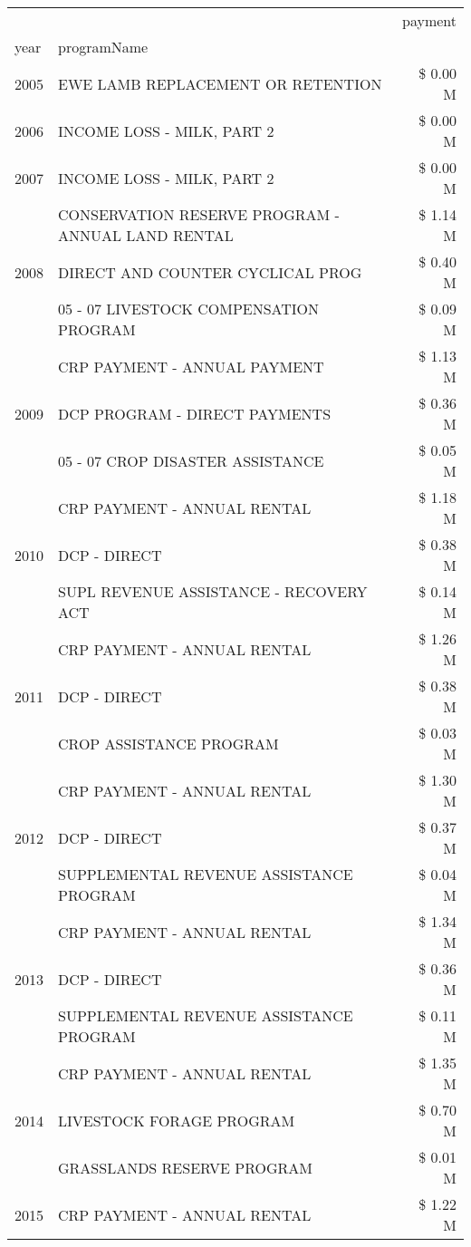\begin{tabular}{llr}
\toprule
 &  & payment \\
year & programName &  \\
\midrule
2005 & EWE LAMB REPLACEMENT OR RETENTION & \$ 0.00 M \\
\cline{1-3}
2006 & INCOME LOSS - MILK, PART 2 & \$ 0.00 M \\
\cline{1-3}
2007 & INCOME LOSS - MILK, PART 2 & \$ 0.00 M \\
\cline{1-3}
\multirow[t]{3}{*}{2008} & CONSERVATION RESERVE PROGRAM - ANNUAL LAND RENTAL & \$ 1.14 M \\
 & DIRECT AND COUNTER CYCLICAL PROG & \$ 0.40 M \\
 & 05 - 07 LIVESTOCK COMPENSATION PROGRAM & \$ 0.09 M \\
\cline{1-3}
\multirow[t]{3}{*}{2009} & CRP PAYMENT - ANNUAL PAYMENT & \$ 1.13 M \\
 & DCP PROGRAM - DIRECT PAYMENTS & \$ 0.36 M \\
 & 05 - 07 CROP DISASTER ASSISTANCE & \$ 0.05 M \\
\cline{1-3}
\multirow[t]{3}{*}{2010} & CRP PAYMENT - ANNUAL RENTAL & \$ 1.18 M \\
 & DCP - DIRECT & \$ 0.38 M \\
 & SUPL REVENUE ASSISTANCE - RECOVERY ACT & \$ 0.14 M \\
\cline{1-3}
\multirow[t]{3}{*}{2011} & CRP PAYMENT - ANNUAL RENTAL & \$ 1.26 M \\
 & DCP - DIRECT & \$ 0.38 M \\
 & CROP ASSISTANCE PROGRAM & \$ 0.03 M \\
\cline{1-3}
\multirow[t]{3}{*}{2012} & CRP PAYMENT - ANNUAL RENTAL & \$ 1.30 M \\
 & DCP - DIRECT & \$ 0.37 M \\
 & SUPPLEMENTAL REVENUE ASSISTANCE PROGRAM & \$ 0.04 M \\
\cline{1-3}
\multirow[t]{3}{*}{2013} & CRP PAYMENT - ANNUAL RENTAL & \$ 1.34 M \\
 & DCP - DIRECT & \$ 0.36 M \\
 & SUPPLEMENTAL REVENUE ASSISTANCE PROGRAM & \$ 0.11 M \\
\cline{1-3}
\multirow[t]{3}{*}{2014} & CRP PAYMENT - ANNUAL RENTAL & \$ 1.35 M \\
 & LIVESTOCK FORAGE PROGRAM & \$ 0.70 M \\
 & GRASSLANDS RESERVE PROGRAM & \$ 0.01 M \\
\cline{1-3}
\multirow[t]{3}{*}{2015} & CRP PAYMENT - ANNUAL RENTAL & \$ 1.22 M \\

\end{tabular}
